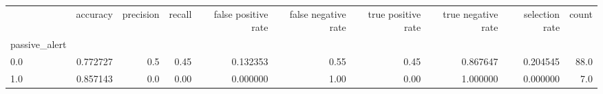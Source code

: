 \begin{tabular}{lrrrrrrrrr}
\toprule
{} &  accuracy &  precision &  recall &  false positive rate &  false negative rate &  true positive rate &  true negative rate &  selection rate &  count \\
passive\_alert &           &            &         &                      &                      &                     &                     &                 &        \\
\midrule
0.0           &  0.772727 &        0.5 &    0.45 &             0.132353 &                 0.55 &                0.45 &            0.867647 &        0.204545 &   88.0 \\
1.0           &  0.857143 &        0.0 &    0.00 &             0.000000 &                 1.00 &                0.00 &            1.000000 &        0.000000 &    7.0 \\
\bottomrule
\end{tabular}
